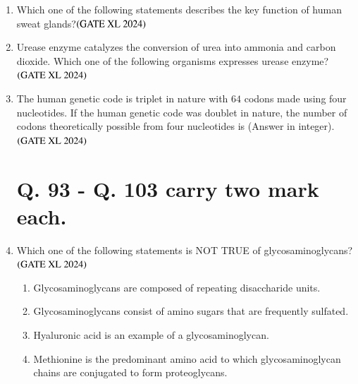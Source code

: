 \documentclass[journal]{IEEEtran}
\begin{document}
\begin{enumerate}
    \item Which one of the following statements describes the key function of human sweat glands?\hfill $\left(\text{GATE XL 2024}\right)$
    \begin{enumerate}
    \end{enumerate}

    \item Urease enzyme catalyzes the conversion of urea into ammonia and carbon dioxide. Which one of the following organisms expresses urease enzyme?\hfill $\left(\text{GATE XL 2024}\right)$
    \begin{enumerate}
    \end{enumerate}

    \item The human genetic code is triplet in nature with $64$ codons made using four nucleotides. If the human genetic code was doublet in nature, the number of codons theoretically possible from four nucleotides is (Answer in integer).\hfill $\left(\text{GATE XL 2024}\right)$

\section*{Q. 93 - Q. 103 carry two mark each.} 
    \item Which one of the following statements is NOT TRUE of glycosaminoglycans?\hfill $\left(\text{GATE XL 2024}\right)$
    \begin{enumerate}
        \item Glycosaminoglycans are composed of repeating disaccharide units.
        \item Glycosaminoglycans consist of amino sugars that are frequently sulfated.
        \item Hyaluronic acid is an example of a glycosaminoglycan.
        \item Methionine is the predominant amino acid to which glycosaminoglycan chains are conjugated to form proteoglycans.
    \end{enumerate}


\end{enumerate}
\end{document}
